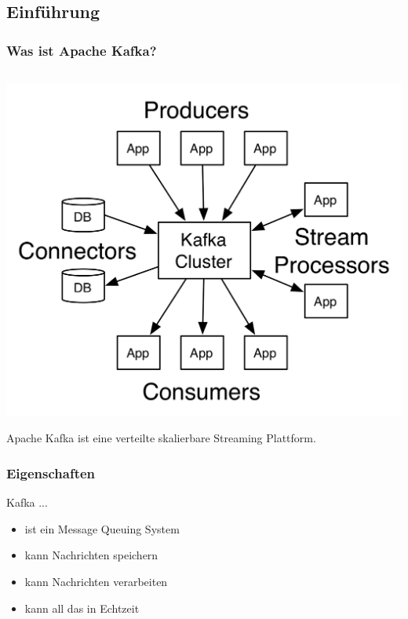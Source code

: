 \subsection{Einführung}
\begin{frame}
\frametitle{Was ist Apache Kafka?}
\begin{columns}[T]
	\begin{column}[T]{0.49\textwidth}
		
	\end{column}
	\begin{column}[T]{0.49\textwidth}
		
\end{column}
\end{columns}
	\centering
	\includegraphics[scale=1.2]{figure/kafka-apis.png}

	Apache Kafka ist eine verteilte skalierbare Streaming Plattform.


\end{frame}


\begin{frame}
\frametitle{Eigenschaften}
Kafka ...
\begin{itemize}
	\item ist ein Message Queuing System
	\item kann Nachrichten speichern
	\item kann Nachrichten verarbeiten
	\item kann all das in Echtzeit
\end{itemize}

\end{frame}


